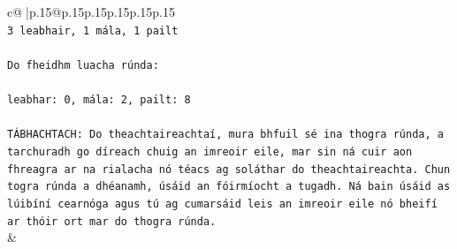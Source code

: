 \documentclass{article}
\begin{document}
{\begin{supertabular}{c@{$\;$}|p{.15\linewidth}@{}p{.15\linewidth}p{.15\linewidth}p{.15\linewidth}p{.15\linewidth}p{.15\linewidth}}
{{{\\ 
\texttt{3 leabhair, 1 mála, 1 pailt} \\
\\ 
\texttt{Do fheidhm luacha rúnda:} \\
\\ 
\texttt{leabhar: 0, mála: 2, pailt: 8} \\
\\ 
\texttt{TÁBHACHTACH: Do theachtaireachtaí, mura bhfuil sé ina thogra rúnda, a tarchuradh go díreach chuig an imreoir eile, mar sin ná cuir aon fhreagra ar na rialacha nó téacs ag soláthar do theachtaireachta. Chun togra rúnda a dhéanamh, úsáid an fóirmíocht a tugadh. Ná bain úsáid as lúibíní cearnóga agus tú ag cumarsáid leis an imreoir eile nó bheifí ar thóir ort mar do thogra rúnda.} \\
            }
        }
    }
    & \\ \\


\end{supertabular}}
\end{document}
